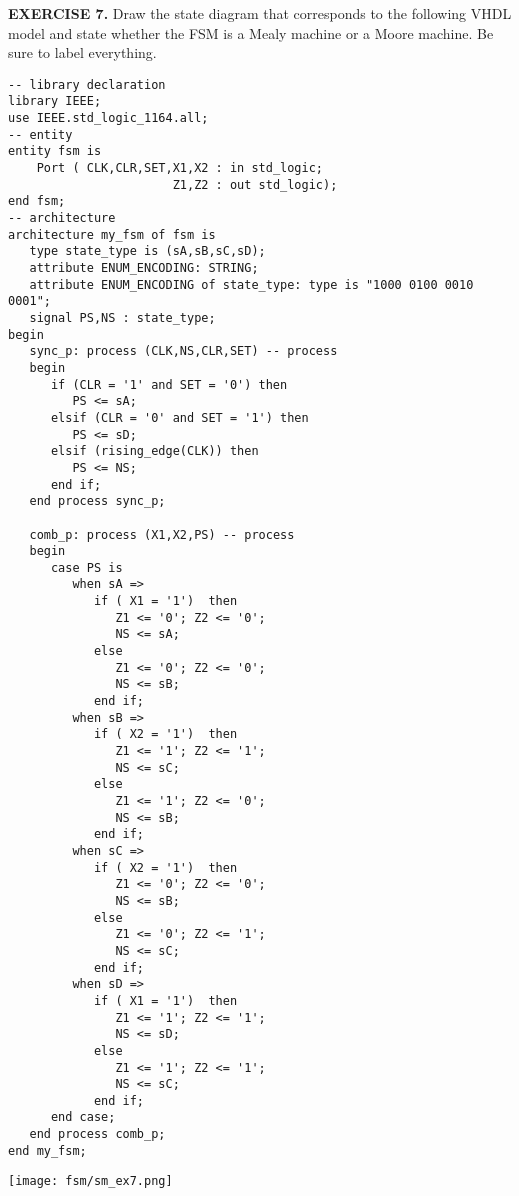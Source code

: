 \vspace{20pt}
\noindent
\begin{minipage}{1\textwidth}
\textbf{EXERCISE 7.}
Draw the state diagram that corresponds to the following VHDL model and state whether the FSM is a Mealy machine or a Moore machine. Be sure to label everything.
\vspace{10pt}
\end{minipage}
\begin{minipage}{0.66\textwidth}

\begin{lstlisting}
-- library declaration
library IEEE;
use IEEE.std_logic_1164.all;
-- entity
entity fsm is
    Port ( CLK,CLR,SET,X1,X2 : in std_logic;
                       Z1,Z2 : out std_logic);
end fsm;
-- architecture
architecture my_fsm of fsm is
   type state_type is (sA,sB,sC,sD); 
   attribute ENUM_ENCODING: STRING; 
   attribute ENUM_ENCODING of state_type: type is "1000 0100 0010 0001";
   signal PS,NS : state_type; 
begin
   sync_p: process (CLK,NS,CLR,SET) -- process
   begin
      if (CLR = '1' and SET = '0') then 
         PS <= sA; 
	  elsif (CLR = '0' and SET = '1') then 
	     PS <= sD;
      elsif (rising_edge(CLK)) then   
         PS <= NS; 
      end if; 
   end process sync_p; 

   comb_p: process (X1,X2,PS) -- process
   begin
      case PS is 
         when sA =>  
            if ( X1 = '1')  then 
               Z1 <= '0'; Z2 <= '0';   
               NS <= sA; 
            else  
               Z1 <= '0'; Z2 <= '0';   
               NS <= sB; 
            end if; 
         when sB =>
            if ( X2 = '1')  then 
               Z1 <= '1'; Z2 <= '1';   
               NS <= sC; 
            else  
               Z1 <= '1'; Z2 <= '0';   
               NS <= sB; 
            end if;				
         when sC =>
            if ( X2 = '1')  then 
               Z1 <= '0'; Z2 <= '0';   
               NS <= sB; 
            else  
               Z1 <= '0'; Z2 <= '1';   
               NS <= sC; 
            end if;
         when sD =>
            if ( X1 = '1')  then 
               Z1 <= '1'; Z2 <= '1';   
               NS <= sD; 
            else  
               Z1 <= '1'; Z2 <= '1';   
               NS <= sC; 
            end if;				
      end case; 
   end process comb_p; 
end my_fsm;
\end{lstlisting}
\end{minipage}
\begin{minipage}{0.29\textwidth}
\texttt{[image: fsm/sm\_ex7.png]}
\vspace{250px}
\end{minipage}

